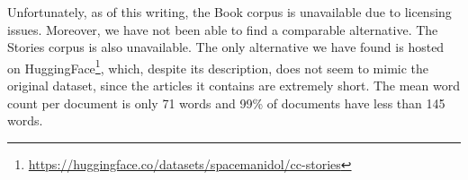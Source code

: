Unfortunately, as of this writing, the Book corpus is unavailable due to
licensing issues. Moreover, we have not been able to find a comparable
alternative. The Stories corpus is also unavailable. The only alternative we
have found is hosted on
HuggingFace\footnote{\url{https://huggingface.co/datasets/spacemanidol/cc-stories}},
which, despite its description, does not seem to mimic the original dataset,
since the articles it contains are extremely short. The mean word count per
document is only 71 words and 99\% of documents have less than 145 words.
